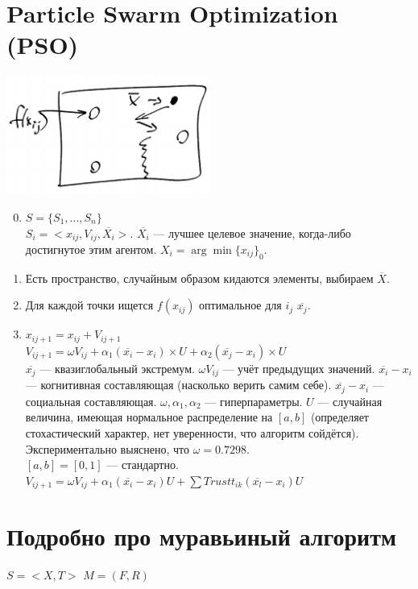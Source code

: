\documentclass[12pt]{article}
\begin{document}
\section{Particle Swarm Optimization (PSO)}

\includegraphics[width=0.5\textwidth]{graphics/pic04.png}
\begin{enumerate}
    \setcounter{enumi}{-1}
    \item $S = \{S_1, ..., S_n\}$ \\
          $S_i = <x_{ij}, V_{ij}, \overline{X_i}>$. $\overline{X_i}$ — лучшее целевое значение, когда-либо достигнутое этим агентом. $X_i = \arg \min \{x_{ij}\}_0$.
    \item Есть пространство, случайным образом кидаются элементы, выбираем $\overline{X}$.
    \item Для каждой точки ищется $f(x_{ij})$ оптимальное для ${i}_j$ $\overline{x_j}$.
    \item $x_{ij+1} = x_{ij} + V_{ij+1}$ \\
          $V_{ij+1} = \omega V_{ij} + \alpha_1 (\overline{x_i} - x_i) \times U + \alpha_2 (\overline{x_j} - x_i) \times U$ \\
          $\overline{x_j}$ — квазиглобальный экстремум. $\omega V_{ij}$ — учёт предыдущих значений. $\overline{x_i} - x_i$ — когнитивная составляющая (насколько верить самим себе). $\overline{x_j} - x_i$ — социальная составляющая. $\omega, \alpha_1, \alpha_2$ — гиперпараметры. $U$ — случайная величина, имеющая нормальное распределение на $[a, b]$ (определяет стохастический характер, нет уверенности, что алгоритм сойдётся). \\
          Экспериментально выяснено, что $\omega = 0.7298$. \\
          $[a, b] = [0, 1]$ — стандартно. \\
          $V_{ij + 1} = \omega V_{ij} + \alpha_1(\overline{x_i} - x_i) U + \sum Trust t_{ik} (\overline{x_l} - x_i)U$
\end{enumerate}

\section{Подробно про муравьиный алгоритм}
$S = <X, T>$ $M = (F, R)$
\end{document}
